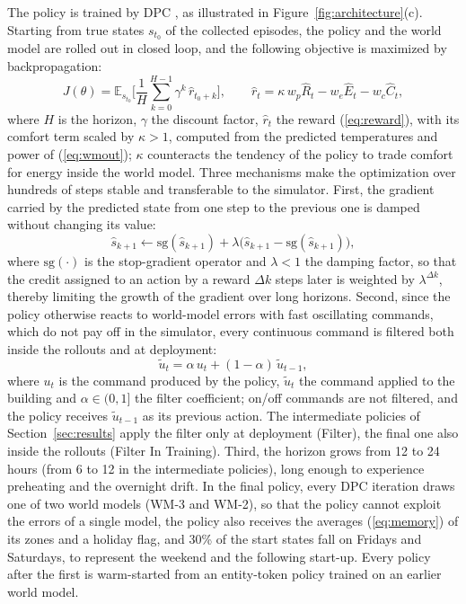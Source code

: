 \documentclass{article}
\begin{document}
The policy is trained by DPC \cite{drgona2022dpc}, as illustrated in Figure~\ref{fig:architecture}(c). Starting from true states $s_{t_0}$ of the collected episodes, the policy and the world model are rolled out in closed loop, and the following objective is maximized by backpropagation:
\begin{equation}
J(\theta) = \mathbb{E}_{s_{t_0}}\Big[\frac{1}{H}\sum_{k=0}^{H-1} \gamma^k \, \hat{r}_{t_0+k}\Big], \qquad \hat{r}_t = \kappa \, w_p \hat{R}_t - w_e \hat{E}_t - w_c \hat{C}_t ,
\label{eq:dpc}
\end{equation}
where $H$ is the horizon, $\gamma$ the discount factor, $\hat{r}_t$ the reward (\ref{eq:reward}), with its comfort term scaled by $\kappa > 1$, computed from the predicted temperatures and power of (\ref{eq:wmout}); $\kappa$ counteracts the tendency of the policy to trade comfort for energy inside the world model. Three mechanisms make the optimization over hundreds of steps stable and transferable to the simulator. First, the gradient carried by the predicted state from one step to the previous one is damped without changing its value:
\begin{equation}
\hat{s}_{k+1} \leftarrow \mathrm{sg}(\hat{s}_{k+1}) + \lambda \big(\hat{s}_{k+1} - \mathrm{sg}(\hat{s}_{k+1})\big),
\label{eq:damp}
\end{equation}
where $\mathrm{sg}(\cdot)$ is the stop-gradient operator and $\lambda < 1$ the damping factor, so that the credit assigned to an action by a reward $\Delta k$ steps later is weighted by $\lambda^{\Delta k}$, thereby limiting the growth of the gradient over long horizons. Second, since the policy otherwise reacts to world-model errors with fast oscillating commands, which do not pay off in the simulator, every continuous command is filtered both inside the rollouts and at deployment:
\begin{equation}
\tilde{u}_t = \alpha\, u_t + (1 - \alpha)\, \tilde{u}_{t-1},
\label{eq:filter}
\end{equation}
where $u_t$ is the command produced by the policy, $\tilde{u}_t$ the command applied to the building and $\alpha \in (0, 1]$ the filter coefficient; on/off commands are not filtered, and the policy receives $\tilde{u}_{t-1}$ as its previous action. The intermediate policies of Section~\ref{sec:results} apply the filter only at deployment (Filter), the final one also inside the rollouts (Filter In Training). Third, the horizon grows from 12 to 24 hours (from 6 to 12 in the intermediate policies), long enough to experience preheating and the overnight drift. In the final policy, every DPC iteration draws one of two world models (WM-3 and WM-2), so that the policy cannot exploit the errors of a single model, the policy also receives the averages (\ref{eq:memory}) of its zones and a holiday flag, and 30\% of the start states fall on Fridays and Saturdays, to represent the weekend and the following start-up. Every policy after the first is warm-started from an entity-token policy trained on an earlier world model.
\end{document}
